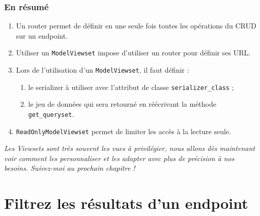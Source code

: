 \subsubsection*{En résumé}
\begin{enumerate}
\item Un router permet de définir en une seule fois toutes les opérations du CRUD sur un endpoint.
\item Utiliser un  {\tt ModelViewset}  impose d’utiliser un router pour définir ses URL.
\item Lors de l’utilisation d’un {\tt ModelViewset}, il faut définir :
\begin{enumerate}
\item le serializer à utiliser avec l’attribut de classe {\tt serializer\_class}  ;
\item le jeu de données qui sera retourné en réécrivant la méthode {\tt get\_queryset}.
\end{enumerate}
\item {\tt ReadOnlyModelViewset}  permet de limiter les accès à la lecture seule.
\end{enumerate}
{\em Les Viewsets sont très souvent les vues à privilégier, nous allons dès maintenant voir comment les personnaliser et les adapter avec plus de précision à nos besoins. Suivez-moi au prochain chapitre !}

\section{Filtrez les résultats d’un endpoint}

